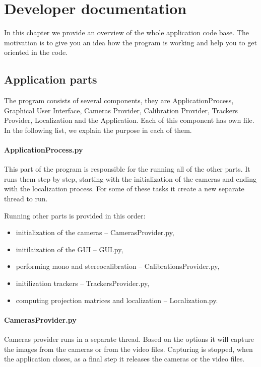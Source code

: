 \chapter{Developer documentation}

In this chapter we provide an overview of the whole application code base. The
motivation is to give you an idea how the program is working and help you to
get oriented in the code.

\section{Application parts}

The program consists of several components, they are ApplicationProcess,
Graphical User Interface, Cameras Provider, Calibration Provider, Trackers
Provider, Localization and the Application. Each of this component has own
file. In the following list, we explain the purpose in each of them.

\subsubsection*{ApplicationProcess.py}

This part of the program is responsible for the running all of the other parts.
It runs them step by step, starting with the initialization of the cameras and
ending with the localization process. For some of these tasks it create a new
separate thread to run.

Running other parts is provided in this order:
\begin{itemize}
\item initialization of the cameras -- CamerasProvider.py,
\item initilaization of the GUI -- GUI.py,
\item performing mono and stereocalibration -- CalibrationsProvider.py,
\item initilization trackers -- TrackersProvider.py,
\item computing projection matrices and localization -- Localization.py.
\end{itemize}

\subsubsection*{CamerasProvider.py}

Cameras provider runs in a separate thread. Based on the options it will
capture the images from the cameras or from the video files. Capturing is
stopped, when the application closes, as a final step it releases the cameras or
the video files.

